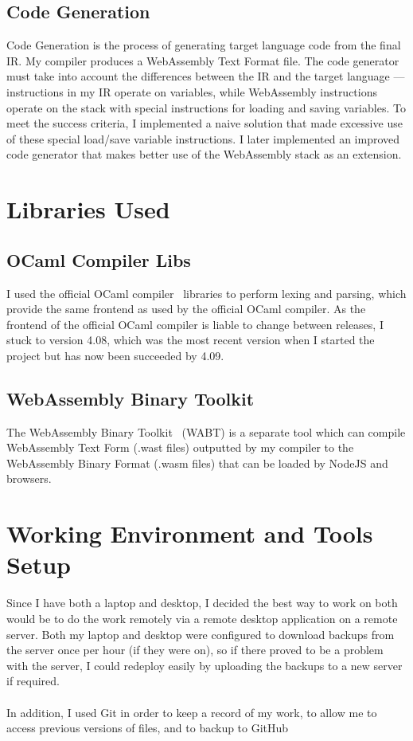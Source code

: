 \subsection{Code Generation}
Code Generation is the process of generating target language code from the final IR. My compiler produces a WebAssembly Text Format file. The code generator must take into account the differences between the IR and the target language --- instructions in my IR operate on variables, while WebAssembly instructions operate on the stack with special instructions for loading and saving variables. To meet the success criteria, I implemented a naive solution that made excessive use of these special load/save variable instructions. I later implemented an improved code generator that makes better use of the WebAssembly stack as an extension.

\section{Libraries Used}
\subsection{OCaml Compiler Libs}
I used the official OCaml compiler~\cite{OCaml} libraries to perform lexing and parsing, which provide the same frontend as used by the official OCaml compiler. As the frontend of the official OCaml compiler is liable to change between releases, I stuck to version 4.08, which was the most recent version when I started the project but has now been succeeded by 4.09.

\subsection{WebAssembly Binary Toolkit}
The WebAssembly Binary Toolkit~\cite{Wabt} (WABT)  is a separate tool which can compile WebAssembly Text Form (.wast files) outputted by my compiler to the WebAssembly Binary Format (.wasm files) that can be loaded by NodeJS and browsers.


\section{Working Environment and Tools Setup}
Since I have both a laptop and desktop, I decided the best way to work on both would be to do the work remotely via a remote desktop application on a remote server. Both my laptop and desktop were configured to download backups from the server once per hour (if they were on), so if there proved to be a problem with the server, I could redeploy easily by uploading the backups to a new server if required.
\\\\
In addition, I used Git in order to keep a record of my work, to allow me to access previous versions of files, and to backup to GitHub

